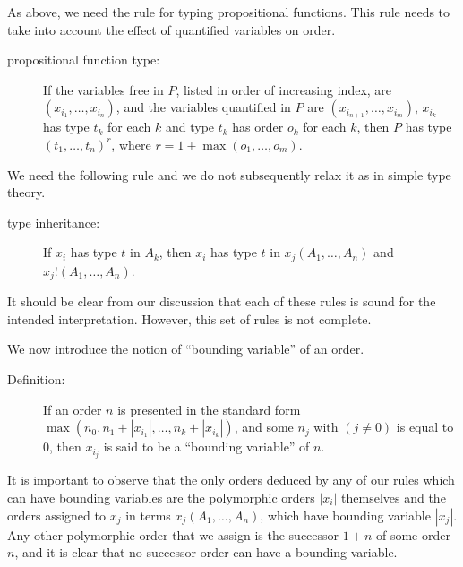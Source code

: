 \documentclass{article}
\begin{document}
As above, we need the rule for typing propositional functions.  This
rule needs to take into account the effect of quantified variables on
order.

\begin{description}

\item[propositional function type:] If the variables free in $P$,
listed in order of increasing index, are $(x_{i_1},\ldots,x_{i_n})$,
and the variables quantified in $P$ are
$(x_{i_{n+1}},\ldots,x_{i_m})$, $x_{i_k}$ has type $t_k$ for each $k$
and type $t_k$ has order $o_k$ for each $k$, then $P$ has type
$(t_1,\ldots,t_n)^r$, where $r=1+\max(o_1,\ldots,o_m)$.

\end{description}

We need the following rule and we do not subsequently relax it as in simple
type theory.

\begin{description}

\item[type inheritance:]  If $x_i$ has type $t$ in $A_k$, then $x_i$ has type
$t$ in $x_j(A_1,\ldots,A_n)$ and $x_j!(A_1,\ldots,A_n)$.

\end{description}

It should be clear from our discussion that each of these rules is
sound for the intended interpretation.  However, this set of rules is
not complete.  

We now introduce the notion of ``bounding variable'' of an order.

\begin{description}

\item[Definition:] If an order $n$ is presented in the standard form
$\max(n_0,n_1+|x_{i_1}|,\ldots,n_k+|x_{i_k}|)$, and some $n_j$ with
$(j\neq 0)$ is equal to 0, then $x_{i_j}$ is said to be a ``bounding
variable'' of $n$.

\end{description}

It is important to observe that the only orders deduced by any of our
rules which can have bounding variables are the polymorphic orders
$|x_i|$ themselves and the orders assigned to $x_j$ in terms
$x_j(A_1,\ldots,A_n)$, which have bounding variable $|x_j|$.  Any
other polymorphic order that we assign is the successor $1+n$ of some
order $n$, and it is clear that no successor order can have a bounding
variable.
\end{document}
